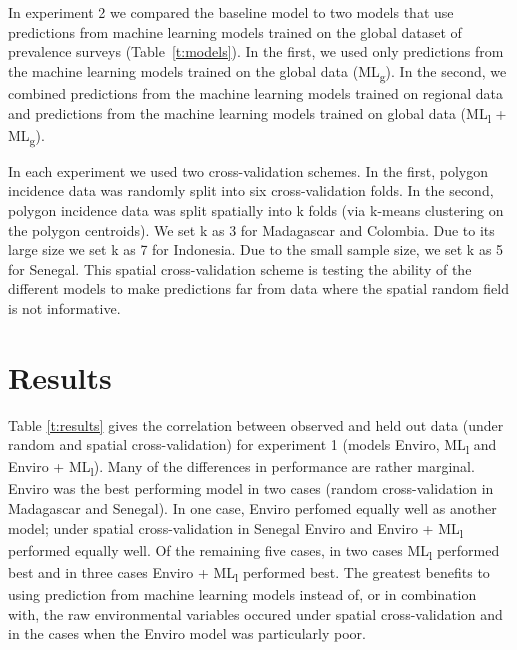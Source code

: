 \documentclass[review]{elsarticle}
\begin{document}
In experiment 2 we compared the baseline model to two models that use predictions from machine learning models trained on the global dataset of prevalence surveys (Table~\ref{t:models}).
In the first, we used only predictions from the machine learning models trained on the global data (ML\textsubscript{g}).
In the second, we combined predictions from the machine learning models trained on regional data and predictions from the machine learning models trained on global data (ML\textsubscript{l} + ML\textsubscript{g}).


In each experiment we used two cross-validation schemes. 
In the first, polygon incidence data was randomly split into six cross-validation folds.
In the second, polygon incidence data was split spatially into k folds (via k-means clustering on the polygon centroids).
We set k as 3 for Madagascar and Colombia.
Due to its large size we set k as 7 for Indonesia.
Due to the small sample size, we set k as 5 for Senegal.
This spatial cross-validation scheme is testing the ability of the different models to make predictions far from data where the spatial random field is not informative.



\section{Results}



Table \ref{t:results} gives the correlation between observed and held out data (under random and spatial cross-validation) for experiment 1 (models Enviro, ML\textsubscript{l} and Enviro + ML\textsubscript{l}).
Many of the differences in performance are rather marginal.
Enviro was the best performing model in two cases (random cross-validation in Madagascar and Senegal).
In one case, Enviro perfomed equally well as another model; under spatial cross-validation in Senegal Enviro and Enviro + ML\textsubscript{l} performed equally well.
Of the remaining five cases, in two cases ML\textsubscript{l} performed best and in three cases Enviro + ML\textsubscript{l} performed best.
The greatest benefits to using prediction from machine learning models instead of, or in combination with, the raw environmental variables occured under spatial cross-validation and in the cases when the Enviro model was particularly poor.
\end{document}
